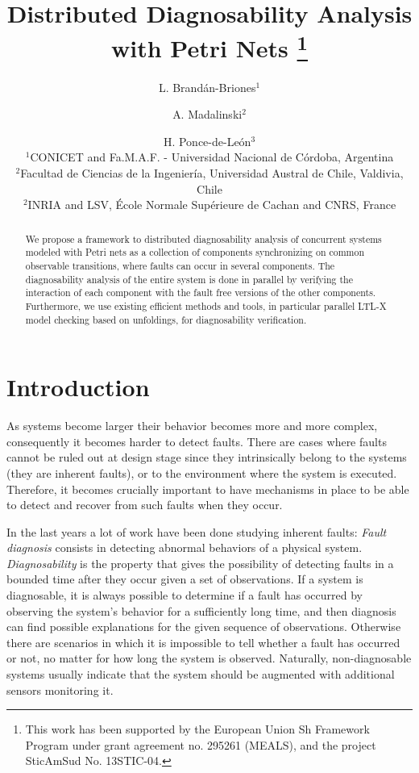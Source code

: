 \documentclass[a4paper]{article}
\title{Distributed Diagnosability Analysis with Petri Nets
\thanks{This work has been supported by the European Union Sh Framework Program under grant agreement no. 295261 (MEALS), and
the project SticAmSud No. 13STIC-04.}}
\author {L. Brand\'an-Briones$^1$ \and A. Madalinski$^2$ \and H. Ponce-de-Le\'on$^3$\\
$^1$CONICET and Fa.M.A.F. - Universidad Nacional de C\'ordoba, Argentina\\
$^2$Facultad de Ciencias de la Ingenier\'ia, Universidad Austral de Chile, Valdivia, Chile\\
$^2$INRIA and LSV, \'Ecole Normale Sup\'erieure de Cachan and CNRS, France\\
}
\begin{document}
\maketitle


\begin{abstract}                We propose a framework to distributed diagnosability analysis of concurrent systems modeled with Petri nets as a collection of components synchronizing on common observable transitions, where faults can occur in several components. The diagnosability analysis of the entire system is done in parallel by verifying the interaction of each component with the fault free versions of the other components. Furthermore, we use existing efficient methods and tools, in particular parallel LTL-X model checking based on unfoldings, for diagnosability verification.





\end{abstract}





\section{Introduction}


As systems become larger their behavior becomes more and more complex, consequently it becomes harder to detect faults. There are cases where faults cannot be ruled out at design stage since they intrinsically belong to the systems (they are inherent faults), or to the environment where the system is executed. Therefore, it becomes crucially important to have mechanisms in place to be able to detect and recover from such faults when they occur.

In the last years a lot of work have been done studying inherent faults: \emph{Fault diagnosis} consists in detecting abnormal behaviors of a physical system. \emph{Diagnosability} is the property that gives the possibility of detecting faults in a bounded time after they occur given a set of observations. If a system is diagnosable, it is always possible to determine if a fault has occurred by observing the system's behavior for a sufficiently long time, and then diagnosis can find possible explanations for the given sequence of observations. Otherwise there are scenarios in which it is impossible to tell whether a fault has occurred or not, no matter for how long the system is observed. Naturally, non-diagnosable systems usually indicate that the system should be augmented with additional sensors monitoring it.
\end{document}
